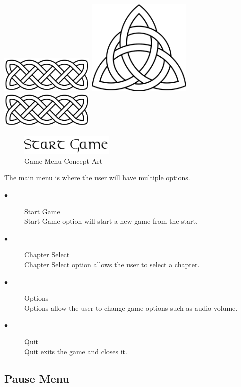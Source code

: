 \documentclass[a4paper]{scrreprt}
\begin{document}
\begin{center}
\includegraphics[width=4.5cm]{celtic-knot}
\includegraphics[width=5cm]{celtic-knot-arrow}
\includegraphics[width=4.5cm]{celtic-knot}
\begin{figure}[H]
\centering
\includegraphics[width=4.5cm]{start-game}
\caption{\label{fig:art} Game Menu Concept Art}
\end{figure}
\end{center}

The main menu is where the user will have multiple options.

\begin{description}
\item[$\bullet$] Start Game \\
Start Game option will start a new game from the start.
\item[$\bullet$] Chapter Select \\
Chapter Select option allows the user to select a chapter.
\item[$\bullet$] Options \\
Options allow the user to change game options such as audio volume.
\item[$\bullet$] Quit \\
Quit exits the game and closes it.
\end{description}

\subsection{Pause Menu}
\end{document}
